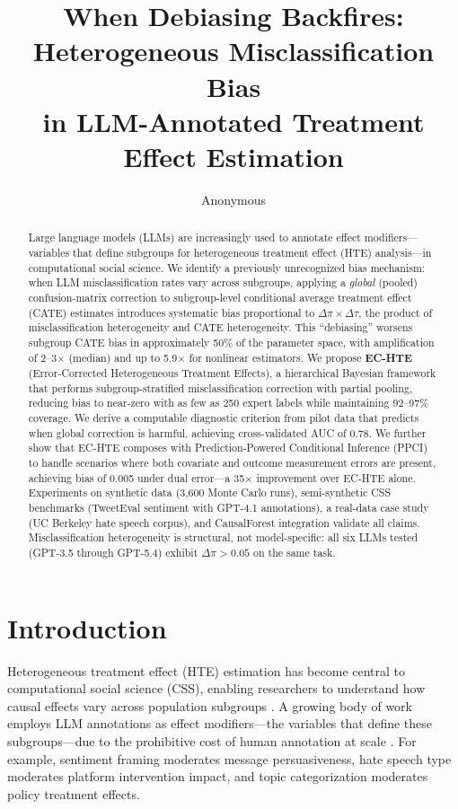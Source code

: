 \documentclass[11pt]{article}
\title{When Debiasing Backfires: Heterogeneous Misclassification Bias\\in LLM-Annotated Treatment Effect Estimation}
\author{Anonymous}
\date{}
\newcommand{\dpi}{\Delta\pi}
\newcommand{\dtau}{\Delta\tau}
\begin{document}
\maketitle

\begin{abstract}
Large language models (LLMs) are increasingly used to annotate effect modifiers---variables that define subgroups for heterogeneous treatment effect (HTE) analysis---in computational social science.
We identify a previously unrecognized bias mechanism: when LLM misclassification rates vary across subgroups, applying a \emph{global} (pooled) confusion-matrix correction to subgroup-level conditional average treatment effect (CATE) estimates introduces systematic bias proportional to $\dpi \times \dtau$, the product of misclassification heterogeneity and CATE heterogeneity.
This ``debiasing'' worsens subgroup CATE bias in approximately 50\% of the parameter space, with amplification of 2--3$\times$ (median) and up to 5.9$\times$ for nonlinear estimators.
We propose \textbf{EC-HTE} (Error-Corrected Heterogeneous Treatment Effects), a hierarchical Bayesian framework that performs subgroup-stratified misclassification correction with partial pooling, reducing bias to near-zero with as few as 250 expert labels while maintaining 92--97\% coverage.
We derive a computable diagnostic criterion from pilot data that predicts when global correction is harmful, achieving cross-validated AUC of 0.78.
We further show that EC-HTE composes with Prediction-Powered Conditional Inference (PPCI) to handle scenarios where both covariate and outcome measurement errors are present, achieving bias of 0.005 under dual error---a 35$\times$ improvement over EC-HTE alone.
Experiments on synthetic data (3,600 Monte Carlo runs), semi-synthetic CSS benchmarks (TweetEval sentiment with GPT-4.1 annotations), a real-data case study (UC Berkeley hate speech corpus), and CausalForest integration validate all claims.
Misclassification heterogeneity is structural, not model-specific: all six LLMs tested (GPT-3.5 through GPT-5.4) exhibit $\dpi > 0.05$ on the same task.
\end{abstract}

\section{Introduction}
\label{sec:intro}

Heterogeneous treatment effect (HTE) estimation has become central to computational social science (CSS), enabling researchers to understand how causal effects vary across population subgroups \cite{athey2016recursive,wager2018estimation}.
A growing body of work employs LLM annotations as effect modifiers---the variables that define these subgroups---due to the prohibitive cost of human annotation at scale \cite{gilardi2023chatgpt,tornberg2024chatgpt4,ziems2024can}.
For example, sentiment framing moderates message persuasiveness, hate speech type moderates platform intervention impact, and topic categorization moderates policy treatment effects.
\end{document}
